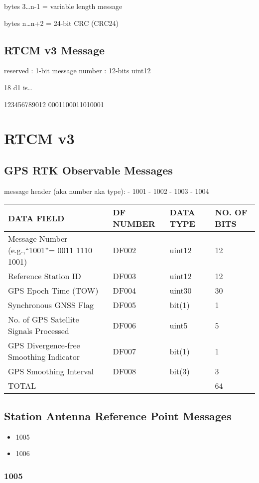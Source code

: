bytes 3\ldots{}n-1 = variable length message

bytes n\ldots{}n+2 = 24-bit CRC (CRC24)

\subsection{RTCM v3 Message}\label{rtcm-v3-message}

reserved : 1-bit message number : 12-bits uint12

18 d1 is\ldots{}

123456789012 0001100011010001

\section{RTCM v3}\label{rtcm-v3-3}

\subsection{GPS RTK Observable
Messages}\label{gps-rtk-observable-messages}

message header (aka number aka type): - 1001 - 1002 - 1003 - 1004

\begin{longtable}[]{@{}llll@{}}
\toprule
DATA FIELD & DF NUMBER & DATA TYPE & NO. OF BITS\tabularnewline
\midrule
\endhead
Message Number (e.g.,``1001''= 0011 1110 1001) & DF002 & uint12 &
12\tabularnewline
Reference Station ID & DF003 & uint12 & 12\tabularnewline
GPS Epoch Time (TOW) & DF004 & uint30 & 30\tabularnewline
Synchronous GNSS Flag & DF005 & bit(1) & 1\tabularnewline
No. of GPS Satellite Signals Processed & DF006 & uint5 &
5\tabularnewline
GPS Divergence-free Smoothing Indicator & DF007 & bit(1) &
1\tabularnewline
GPS Smoothing Interval & DF008 & bit(3) & 3\tabularnewline
TOTAL & & & 64\tabularnewline
\bottomrule
\end{longtable}

\subsection{Station Antenna Reference Point
Messages}\label{station-antenna-reference-point-messages}

\begin{itemize}
\item
  1005
\item
  1006
\end{itemize}

\subsubsection{1005}\label{section}

